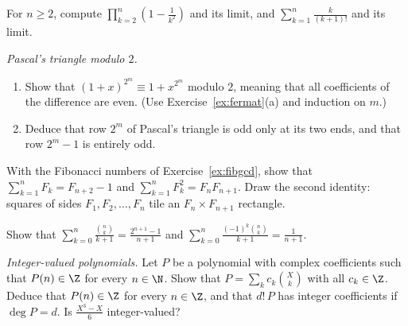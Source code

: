\begin{exercise}[$\star$]\label{ex:telprod}
For $n\ge2$, compute $\displaystyle\prod_{k=2}^n\left(1-\frac1{k^2}\right)$ and its limit, and $\displaystyle\sum_{k=1}^n\frac{k}{(k+1)!}$ and its limit.
\end{exercise}

\begin{exercise}[$\star\star$]\label{ex:pascalmod2}
\emph{Pascal's triangle modulo $2$.}
\begin{enumerate}[label=(\alph*)]
\item Show that $(1+x)^{2^m}\equiv1+x^{2^m}$ modulo $2$, meaning that all coefficients of the difference are even. (Use Exercise~\ref{ex:fermat}(a) and induction on $m$.)
\item Deduce that row $2^m$ of Pascal's triangle is odd only at its two ends, and that row $2^m-1$ is entirely odd.
\end{enumerate}
\end{exercise}

\begin{exercise}[$\star\star$]\label{ex:fibsums}
With the Fibonacci numbers of Exercise~\ref{ex:fibgcd}, show that $\sum_{k=1}^nF_k=F_{n+2}-1$ and $\sum_{k=1}^nF_k^2=F_nF_{n+1}$. Draw the second
identity: squares of sides $F_1,F_2,\dots,F_n$ tile an $F_n\times F_{n+1}$ rectangle.
\end{exercise}

\begin{exercise}[$\star\star$]\label{ex:binomfrac}
Show that $\displaystyle\sum_{k=0}^n\frac{\binom nk}{k+1}=\frac{2^{n+1}-1}{n+1}$ and $\displaystyle\sum_{k=0}^n\frac{(-1)^k\binom nk}{k+1}=\frac1{n+1}$.
\end{exercise}

\begin{exercise}[$\star\star$]\label{ex:intpoly}
\emph{Integer-valued polynomials.} Let $P$ be a polynomial with complex coefficients such that $P(n)\in\Z$ for every $n\in\N$. Show that
$P=\sum_kc_k\binom Xk$ with all $c_k\in\Z$. Deduce that $P(n)\in\Z$ for every $n\in\Z$, and that $d!\,P$ has integer coefficients if $\deg P=d$. Is
$\frac{X^3-X}6$ integer-valued?
\end{exercise}



